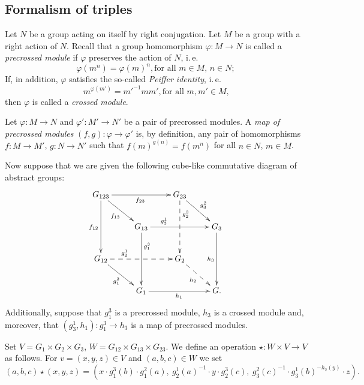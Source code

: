\subsection{Formalism of triples}\label{subsec:triples}

Let $N$ be a group acting on itself by right conjugation.
Let $M$ be a group with a right action of $N$.
Recall that a group homomorphism $\varphi\colon M \to N$ is called a \textit{precrossed module} if $\varphi$ preserves the action of $N$, i.\,e.
\[\varphi(m^n) = \varphi(m)^n, \text{for all $m \in M$, $n\in N;$} \]
If, in addition, $\varphi$ satisfies the so-called \textit{Peiffer identity}, i.\,e.
\[{m}^{\varphi(m')} = {m'}^{-1} m m', \text{for all $m, m' \in M$,}\]
then $\varphi$ is called a \textit{crossed module}.

Let $\varphi\colon M \to N$ and $\varphi' \colon M' \to N'$ be a pair of precrossed modules.
A \textit{map of precrossed modules} $(f, g)\colon \varphi \to \varphi'$ is, by definition, any pair of homomorphisms
$f \colon M \to M'$, $g \colon N \to N'$ such that ${f(m)}^{g(n)} = f(m^n)$ for all $n \in N$, $m \in M$.

Now suppose that we are given the following cube-like commutative diagram of abstract groups:
\begin{equation} \label{eq:cube} \begin{split} \xymatrix{
    G_{123} \ar[rr]_{f_{23}} \ar[dd]_{f_{12}} \ar[rd]_{f_{13}} &                        & G_{23} \ar@{-->}[dd]^(.3){g_2^3} \ar[rd]^{g^2_3} &           \\
    & G_{13} \ar[rr]^(.3){g^1_3} \ar^(.3){g^3_1}[dd] &                   & G_3 \ar[dd]_{h_3} \\
    G_{12} \ar@{-->}[rr]^(.3){g_2^1} \ar[rd]_{g_1^2}          &                        & G_2 \ar@{-->}[rd]_{h_2}         &           \\
    & G_1 \ar[rr]_{h_1}              &                   & G.} \end{split} \end{equation}
Additionally, suppose that $g_1^3$ is a precrossed module, $h_3$ is a crossed module and, moreover, that $(g_3^1, h_1) \colon g_1^3 \to h_3$ is a map of precrossed modules.

Set $V = G_1 \times G_2 \times G_3$, $W = G_{12} \times G_{13} \times G_{23}$.
We define an operation $\star \colon W \times V \to V$ as follows. For $v = (x, y, z) \in V$ and $(a, b, c) \in W$ we set
\[(a, b, c) \star (x, y, z) = (x \cdot g_1^3(b) \cdot g_1^2(a),\ g_2^1(a)^{-1} \cdot y \cdot g_2^3(c),\ g_3^2(c)^{-1} \cdot g_3^1(b)^{-h_2(y)} \cdot z).\]

